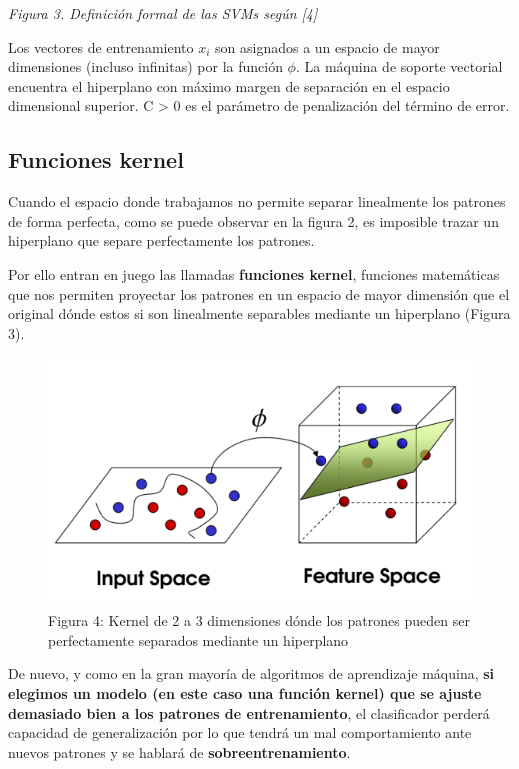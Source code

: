 \documentclass[11pt]{article}
\makeatletter
\def\maxwidth{\ifdim\Gin@nat@width>\linewidth\linewidth
    \else\Gin@nat@width\fi}
\let\Oldincludegraphics\includegraphics
\renewcommand{\includegraphics}[1]{\Oldincludegraphics[width=.8\maxwidth]{#1}}
\makeatother
\begin{document}
\emph{Figura 3. Definición formal de las SVMs según {[}4{]}}

Los vectores de entrenamiento \(x_i\) son asignados a un espacio de
mayor dimensiones (incluso infinitas) por la función \(\phi\). La
máquina de soporte vectorial encuentra el hiperplano con máximo margen
de separación en el espacio dimensional superior. C \textgreater{} 0 es
el parámetro de penalización del término de error.

\subsection{Funciones kernel}\label{funciones-kernel}

Cuando el espacio donde trabajamos no permite separar linealmente los
patrones de forma perfecta, como se puede observar en la figura 2, es
imposible trazar un hiperplano que separe perfectamente los patrones.

Por ello entran en juego las llamadas \textbf{funciones kernel},
funciones matemáticas que nos permiten proyectar los patrones en un
espacio de mayor dimensión que el original dónde estos si son
linealmente separables mediante un hiperplano (Figura 3).

\begin{figure}
\centering
\includegraphics{ejemplo-kernel.PNG}
\caption{Figura 4: Kernel de 2 a 3 dimensiones dónde los patrones pueden
ser perfectamente separados mediante un hiperplano}
\end{figure}

De nuevo, y como en la gran mayoría de algoritmos de aprendizaje
máquina, \textbf{si elegimos un modelo (en este caso una función kernel)
que se ajuste demasiado bien a los patrones de entrenamiento}, el
clasificador perderá capacidad de generalización por lo que tendrá un
mal comportamiento ante nuevos patrones y se hablará de
\textbf{sobreentrenamiento}.
\end{document}
